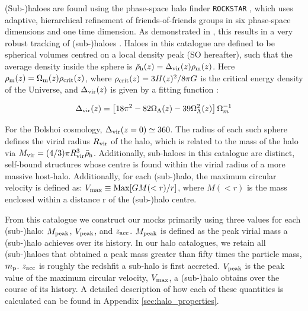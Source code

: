 \documentclass[a4paper,fleqn,usenatbib]{mnras}
\begin{document}
(Sub-)haloes are found using the phase-space halo finder {\tt ROCKSTAR} \citep{Behroozi:2013cn, Behroozi:2013dz}, which uses adaptive, hierarchical refinement of friends-of-friends groups in six phase-space dimensions and one time dimension. As demonstrated in \cite{Knebe:2011jc, Knebe:2013bp}, this results in a very robust tracking of (sub-)haloes \citep[also see][]{vandenBosch:2014tl}. Haloes in this catalogue are defined to be spherical volumes centred on a local density peak (SO hereafter), such that the average density inside the sphere is $\bar{\rho}_{\rm h}(z) = \Delta_{\rm vir}(z)\rho_{\rm m}(z)$.  Here $\rho_{\rm m}(z) = \Omega_{\rm m}(z) \rho_{\rm crit}(z)$, where $\rho_{\rm crit}(z) = 3H(z)^2/8\pi G$ is the critical energy density of the Universe, and $\Delta_{\rm vir}(z)$ is given by a fitting function \citep{Bryan:1998cc}:
%
\begin{linenomath}
\begin{equation}
\Delta_{\rm vir}(z) = \left[ 18\pi^2 - 82\Omega_{\Lambda}(z) - 39\Omega_{\Lambda}^2(z) \right]\Omega_m^{-1}
\end{equation}
\end{linenomath}
%
For the Bolshoi cosmology, $\Delta_{\rm vir}(z=0)\simeq 360$.  The radius of each such sphere defines the virial radius $R_{\rm vir}$ of the halo, which is related to the mass of the halo via $M_{\rm vir} = (4/3)\pi R_{\rm vir}^3\bar{\rho}_{\rm h}$. Additionally, sub-haloes in this catalogue are distinct, self-bound structures whose centre is found within the virial radius of a more massive host-halo.  Additionally, for each (sub-)halo, the maximum circular velocity is defined as: $V_{\rm max} \equiv {\rm Max}[GM(<r)/r]$, where $M(<r)$ is the mass enclosed within a distance r of the (sub-)halo centre.

From this catalogue we construct our mocks primarily using three values for each (sub-)halo: $M_{\rm peak}$, $V_{\rm peak}$, and $z_{\rm acc}$.  $M_{\rm peak}$ is defined as the peak virial mass a (sub-)halo achieves over its history.  In our halo catalogues, we retain all (sub-)haloes that obtained a peak mass greater than fifty times the particle mass, $m_{\rm p}$.  $z_{\rm acc}$ is roughly the redshfit a sub-halo is first accreted.  $V_{\rm peak}$ is the peak value of the maximum circular velocity, $V_{\rm max}$, a (sub-)halo obtains over the course of its history.  A detailed description of how each of these quantities is calculated can be found in Appendix \ref{sec:halo_properties}.
\end{document}
